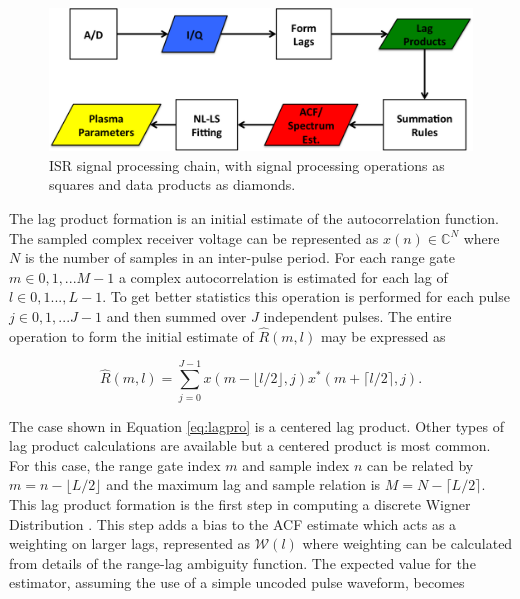\documentclass[draft,ras]{agutex}
\begin{document}
\begin{article}
\begin{figure}[!t]
\centering
\includegraphics[width=6in]{datastackchain}
\caption{ISR signal processing chain, with signal processing operations as squares and data products as diamonds.}
\label{fig:chain}
\end{figure}


The lag product formation is an initial estimate of the autocorrelation function. The sampled complex receiver voltage can be represented as $x(n) \in\mathbb{C}^N$ where $N$ is the number of samples in an inter-pulse period. For each range gate $m\in 0,1,...M-1$ a complex autocorrelation is estimated for each lag of $l \in 0,1...,L-1$.  To get better statistics this operation is performed for each pulse $j\in 0,1,...J-1$ and then summed over $J$ independent pulses. The entire operation to form the initial estimate of $\widehat{R}(m,l)$ may be expressed as

\begin{equation}
\label{eq:lagpro}
\widehat{R}(m,l) = \displaystyle\sum\limits_{j=0}^{J-1} x(m-\lfloor l/2\rfloor,j)x^*(m+\lceil l/2 \rceil,j).
\end{equation}

The case shown in Equation \ref{eq:lagpro} is a centered lag product.  Other types of lag product calculations are available but a centered product is most common. For this case, the range gate index $m$ and sample index $n$ can be related by $m=n-\lfloor L/2\rfloor$ and the maximum lag and sample relation is $M=N-\lceil L/2 \rceil$.  This lag product formation is the first step in computing a discrete Wigner Distribution \citep{TFAcohen}. This  step adds a bias to the ACF estimate which acts as a weighting on larger lags, represented as $\mathcal{W}(l)$ where weighting can be calculated from details of the range-lag ambiguity function. The expected value for the estimator, assuming the use of a simple uncoded pulse waveform, becomes


\end{article}
\end{document}
